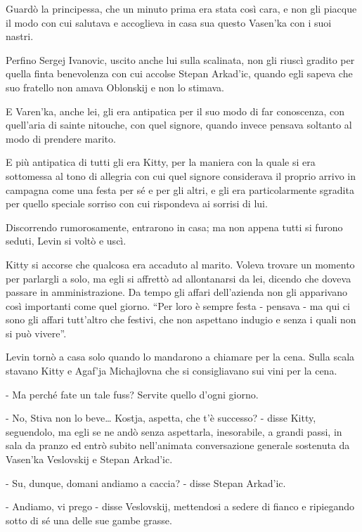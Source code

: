Guardò la principessa, che un minuto prima era stata così cara, e non gli piacque il modo con cui salutava e accoglieva in casa sua questo Vasen'ka con i suoi nastri. 

Perfino Sergej Ivanovic, uscito anche lui sulla scalinata, non gli riuscì gradito per quella finta benevolenza con cui accolse Stepan Arkad'ic, quando egli sapeva che suo fratello non amava Oblonskij e non lo stimava. 

E Varen'ka, anche lei, gli era antipatica per il suo modo di far conoscenza, con quell'aria di sainte nitouche, con quel signore, quando invece pensava soltanto al modo di prendere marito. 

E più antipatica di tutti gli era Kitty, per la maniera con la quale si era sottomessa al tono di allegria con cui quel signore considerava il proprio arrivo in campagna come una festa per sé e per gli altri, e gli era particolarmente sgradita per quello speciale sorriso con cui rispondeva ai sorrisi di lui. 

Discorrendo rumorosamente, entrarono in casa; ma non appena tutti si furono seduti, Levin si voltò e uscì. 

Kitty si accorse che qualcosa era accaduto al marito. Voleva trovare un momento per parlargli a solo, ma egli si affrettò ad allontanarsi da lei, dicendo che doveva passare in amministrazione. Da tempo gli affari dell'azienda non gli apparivano così importanti come quel giorno. ``Per loro è sempre festa - pensava - ma qui ci sono gli affari tutt'altro che festivi, che non aspettano indugio e senza i quali non si può vivere''. 

Levin tornò a casa solo quando lo mandarono a chiamare per la cena. Sulla scala stavano Kitty e Agaf'ja Michajlovna che si consigliavano sui vini per la cena. 

- Ma perché fate un tale fuss? Servite quello d'ogni giorno. 

- No, Stiva non lo beve\ldots{} Kostja, aspetta, che t'è successo? - disse Kitty, seguendolo, ma egli se ne andò senza aspettarla, inesorabile, a grandi passi, in sala da pranzo ed entrò subito nell'animata conversazione generale sostenuta da Vasen'ka Veslovskij e Stepan Arkad'ic. 

- Su, dunque, domani andiamo a caccia? - disse Stepan Arkad'ic. 

- Andiamo, vi prego - disse Veslovskij, mettendosi a sedere di fianco e ripiegando sotto di sé una delle sue gambe grasse. 

